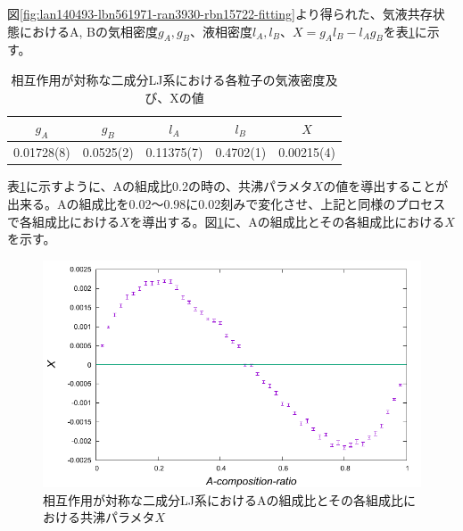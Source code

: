 \documentclass[titlepage]{jsreport}
\begin{document}
図\ref{fig:lan140493-lbn561971-ran3930-rbn15722-fitting}より得られた、気液共存状態におけるA, Bの気相密度$g_A, g_B$、液相密度$l_A, l_B$、$X=g_Al_B-l_Ag_B$を表\ref{table:lan140493-lbn561971-ran3930-rbn15722-fitting}に示す。

\begin{table}[htbp]
    \begin{center}
        \caption{相互作用が対称な二成分LJ系における各粒子の気液密度及び、Xの値}
        \label{table:lan140493-lbn561971-ran3930-rbn15722-fitting}
        \begin{tabular}{c c c c c}
            $g_A$ & $g_B$ & $l_A$ & $l_B$ & $X$ \\
            \hline
            0.01728(8)& 0.0525(2) & 0.11375(7) & 0.4702(1) & 0.00215(4) \\
        \end{tabular}
    \end{center}
\end{table}

表\ref{table:lan140493-lbn561971-ran3930-rbn15722-fitting}に示すように、Aの組成比0.2の時の、共沸パラメタ$X$の値を導出することが出来る。Aの組成比を0.02〜0.98に0.02刻みで変化させ、上記と同様のプロセスで各組成比における$X$を導出する。図\ref{fig:bi-symmetric}に、Aの組成比とその各組成比における$X$を示す。

\begin{figure}[htbp]
    \begin{center}
        \includegraphics[width=14cm]{fig/bi-symmetric/L100T1.0.pdf}
    \end{center}
    \caption{相互作用が対称な二成分LJ系におけるAの組成比とその各組成比における共沸パラメタ$X$}
    \label{fig:bi-symmetric}
\end{figure}
\end{document}
